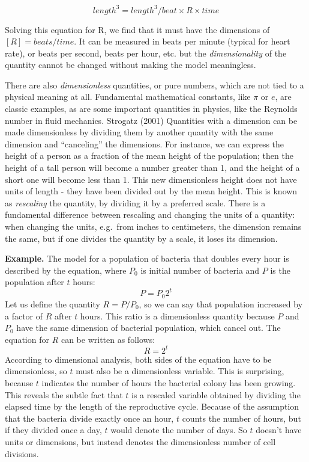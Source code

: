 \documentclass[
  letterpaper,
  DIV=11,
  numbers=noendperiod]{scrreprt}
\begin{document}
\[length^3 = length^3/ beat \times R \times time\]

Solving this equation for R, we find that it must have the dimensions of
\([R] = beats/time\). It can be measured in beats per minute (typical
for heart rate), or beats per second, beats per hour, etc. but the
\emph{dimensionality} of the quantity cannot be changed without making
the model meaningless.

There are also  \emph{dimensionless}
quantities, or pure numbers, which are not tied to a physical meaning at
all. Fundamental mathematical constants, like \(\pi\) or \(e\), are
classic examples, as are some important quantities in physics, like the
Reynolds number in fluid mechanics. Strogatz (2001) Quantities with a
dimension can be made dimensionless by dividing them by another quantity
with the same dimension and ``canceling'' the dimensions. For instance,
we can express the height of a person as a fraction of the mean height
of the population; then the height of a tall person will become a number
greater than 1, and the height of a short one will become less than 1.
This new dimensionless height does not have units of length - they have
been divided out by the mean height. This is known as 
\emph{rescaling} the quantity, by dividing it by a preferred scale.
There is a fundamental difference between rescaling and changing the
units of a quantity: when changing the units, e.g.~from inches to
centimeters, the dimension remains the same, but if one divides the
quantity by a scale, it loses its dimension.

\textbf{Example.} The model for a population of bacteria that doubles
every hour is described by the equation, where \(P_0\) is initial number
of bacteria and \(P\) is the population after \(t\) hours:
\[ P = P_0 2^t \] Let us define the quantity \(R=P/P_0\), so we can say
that population increased by a factor of \(R\) after \(t\) hours. This
ratio is a dimensionless quantity because \(P\) and \(P_0\) have the
same dimension of bacterial population, which cancel out. The equation
for \(R\) can be written as follows: \[ R= 2^t \] According to
dimensional analysis, both sides of the equation have to be
dimensionless, so \(t\) must also be a dimensionless variable. This is
surprising, because \(t\) indicates the number of hours the bacterial
colony has been growing. This reveals the subtle fact that \(t\) is a
rescaled variable obtained by dividing the elapsed time by the length of
the reproductive cycle. Because of the assumption that the bacteria
divide exactly once an hour, \(t\) counts the number of hours, but if
they divided once a day, \(t\) would denote the number of days. So \(t\)
doesn't have units or dimensions, but instead denotes the dimensionless
number of cell divisions.
\end{document}
